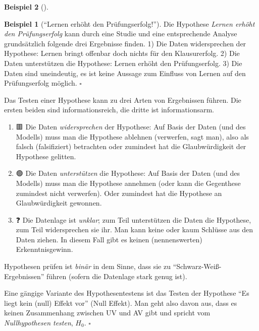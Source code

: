 \documentclass[
  ngerman,
  letterpaper,
  twoside,
  open=any]{scrbook}
\theoremstyle{definition}
\newtheorem{example}{Beispiel}[chapter]
\theoremstyle{plain}
\theoremstyle{definition}
\theoremstyle{definition}
\theoremstyle{remark}
\begin{document}
\begin{example}[]
\begin{example}[\enquote{Lernen erhöht den
Prüfungserfolg!}]
Die Hypothese \emph{Lernen erhöht den Prüfungserfolg} kann durch eine
Studie und eine entsprechende Analyse grundsätzlich folgende drei
Ergebnisse finden. 1) Die Daten widersprechen der Hypothese: Lernen
bringt offenbar doch nichts für den Klausurerfolg. 2) Die Daten
unterstützen die Hypothese: Lernen erhöht den Prüfungserfolg. 3) Die
Daten sind uneindeutig, es ist keine Aussage zum Einfluss von Lernen auf
den Prüfungserfolg möglich. \(\square\)

\end{example}

Das Testen einer Hypothese kann zu drei Arten von Ergebnissen führen.
Die ersten beiden sind informationsreich, die dritte ist
informationsarm.

\begin{enumerate}
\def\labelenumi{\arabic{enumi}.}
\item
  🟥 Die Daten \emph{widersprechen} der Hypothese: Auf Basis der Daten
  (und des Modells) muss man die Hypothese ablehnen (verwerfen, sagt
  man), also als falsch (falsifiziert) betrachten oder zumindest hat die
  Glaubwürdigkeit der Hypothese gelitten.
\item
  🟢 Die Daten \emph{unterstützen} die Hypothese: Auf Basis der Daten
  (und des Modells) muss man die Hypothese annehmen (oder kann die
  Gegenthese zumindest nicht verwerfen). Oder zumindest hat die
  Hypothese an Glaubwürdigkeit gewonnen.
\item
  ❓ Die Datenlage ist \emph{unklar}; zum Teil unterstützen die Daten
  die Hypothese, zum Teil widersprechen sie ihr. Man kann keine oder
  kaum Schlüsse aus den Daten ziehen. In diesem Fall gibt es keinen
  (nennenswerten) Erkenntnisgewinn.
\end{enumerate}

Hypothesen prüfen ist \emph{binär} in dem Sinne, dass sie zu
\enquote{Schwarz-Weiß-Ergebnissen} führen (sofern die Datenlage stark
genug ist).

\begin{tcolorbox}[enhanced jigsaw, arc=.35mm, bottomrule=.15mm, bottomtitle=1mm, breakable, colback=white, colbacktitle=quarto-callout-important-color!10!white, colframe=quarto-callout-important-color-frame, coltitle=black, left=2mm, leftrule=.75mm, opacityback=0, opacitybacktitle=0.6, rightrule=.15mm, title=\textcolor{quarto-callout-important-color}{\faExclamation}\hspace{0.5em}{Wichtig}, titlerule=0mm, toprule=.15mm, toptitle=1mm]

Eine gängige Variante des Hypothesentestens\footnotemark{} ist das
Testen der Hypothese \enquote{Es liegt kein (null) Effekt vor} (Null
Effekt). Man geht also davon aus, dass es keinen Zusammenhang zwischen
UV und AV gibt und spricht vom \emph{Nullhypothesen testen}, \(H_0\).
\(\square\)


\end{tcolorbox}
\end{example}
\end{document}
